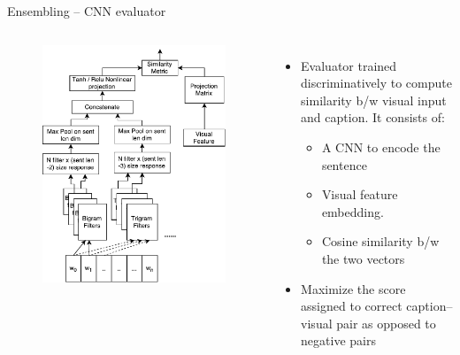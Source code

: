 \documentclass{beamer}
\begin{document}
\begin{frame}{Ensembling -- CNN evaluator}
\begin{columns}       
    \begin{figure}[h]
        \centering
        \includegraphics[width=1.0\textwidth]{images/CnnEval.pdf}
        \vfill
    \end{figure}
    \begin{itemize}
        \item Evaluator trained discriminatively to compute similarity b/w visual input and caption. It consists of: 
           \begin{itemize}
               \item A CNN to encode the sentence 
               \item Visual feature embedding.
               \item Cosine similarity b/w the two vectors 
           \end{itemize}
        \item Maximize the score assigned to correct caption--visual pair as opposed to negative pairs 
    \end{itemize}
\end{columns}
\end{frame}
\end{document}
